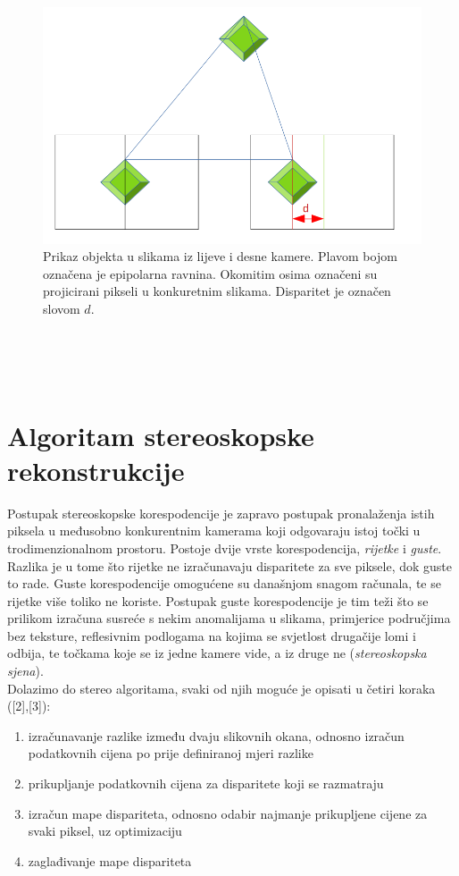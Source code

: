 \documentclass[times, utf8, zavrsni]{fer}
\begin{document}
\begin{figure}[htb]
\centering
\includegraphics[width = 14.5cm]{img/slika4.png}
\caption{Prikaz objekta u slikama iz lijeve i desne kamere. Plavom bojom označena je epipolarna ravnina. Okomitim osima označeni su projicirani pikseli u konkuretnim slikama. Disparitet je označen slovom $d$.}
\label{fig:Disparitet i epipolar}
\end{figure}\\
\\\\
\section{Algoritam stereoskopske rekonstrukcije}
Postupak stereoskopske korespodencije je zapravo postupak pronalaženja istih piksela u međusobno konkurentnim kamerama koji odgovaraju istoj točki u trodimenzionalnom prostoru. Postoje dvije vrste korespodencija, \textit{rijetke} i \textit{guste}. Razlika je u tome što rijetke ne izračunavaju disparitete za sve piksele, dok guste to rade. Guste korespodencije omogućene su današnjom snagom računala, te se rijetke više toliko ne koriste. Postupak guste korespodencije je tim teži što se prilikom izračuna susreće s nekim anomalijama u slikama, primjerice područjima bez teksture, reflesivnim podlogama na kojima se svjetlost drugačije lomi i odbija, te točkama koje se iz jedne kamere vide, a iz druge ne (\textit{stereoskopska sjena}).\\
Dolazimo do stereo algoritama, svaki od njih moguće je opisati u četiri koraka ([2],[3]):
\begin{enumerate}
\item izračunavanje razlike između dvaju slikovnih okana, odnosno izračun podatkovnih cijena po prije definiranoj mjeri razlike
\item prikupljanje podatkovnih cijena za disparitete koji se razmatraju
\item izračun mape dispariteta, odnosno odabir najmanje prikupljene cijene za svaki piksel, uz optimizaciju
\item zaglađivanje mape dispariteta 
\end{enumerate}
\end{document}
